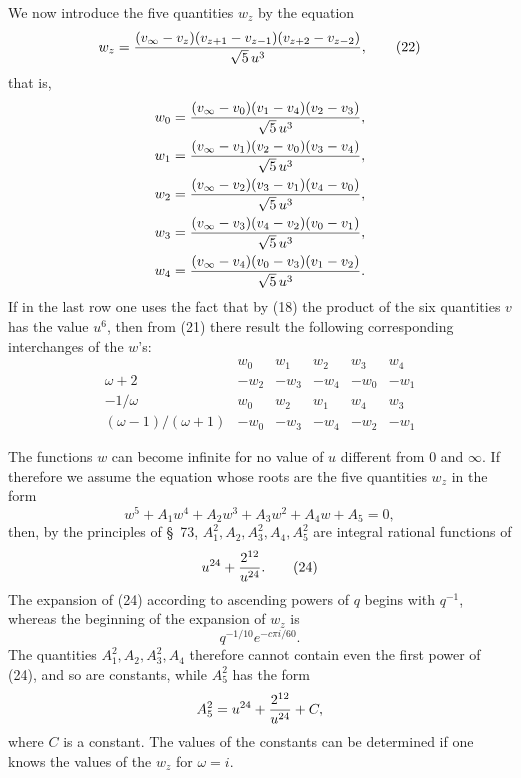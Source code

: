 \documentclass[11pt]{article}
\begin{document}
We now introduce the five quantities \(w_z\) by the equation
\begin{equation}
 w_z={(v_\infty-v_z)(v_{z+1}-v_{z-1})(v_{z+2}-v_{z-2})\over \sqrt5\,u^3},
\tag{22}
\end{equation}
that is,
\[
\begin{aligned}
w_0&={(v_\infty-v_0)(v_1-v_4)(v_2-v_3)\over\sqrt5\,u^3},\\
w_1&={(v_\infty-v_1)(v_2-v_0)(v_3-v_4)\over\sqrt5\,u^3},\\
w_2&={(v_\infty-v_2)(v_3-v_1)(v_4-v_0)\over\sqrt5\,u^3},\\
w_3&={(v_\infty-v_3)(v_4-v_2)(v_0-v_1)\over\sqrt5\,u^3},\\
w_4&={(v_\infty-v_4)(v_0-v_3)(v_1-v_2)\over\sqrt5\,u^3}.
\end{aligned}
\]
If in the last row one uses the fact that by (18) the product of the six quantities \(v\) has the value \(u^6\), then from (21) there result the following corresponding interchanges of the \(w\)'s:
\begin{equation}
\begin{array}{c|ccccc}
& w_0&w_1&w_2&w_3&w_4\\ \hline
\omega+2&-w_2&-w_3&-w_4&-w_0&-w_1\\
-1/\omega&w_0&w_2&w_1&w_4&w_3\\
(\omega-1)/(\omega+1)&-w_0&-w_3&-w_4&-w_2&-w_1
\end{array}
\tag{23}
\end{equation}

The functions \(w\) can become infinite for no value of \(u\) different from \(0\) and \(\infty\). If therefore we assume the equation whose roots are the five quantities \(w_z\) in the form
\[
 w^5+A_1w^4+A_2w^3+A_3w^2+A_4w+A_5=0,
\]
then, by the principles of \S~73, \(A_1^2,A_2,A_3^2,A_4,A_5^2\) are integral rational functions of
\begin{equation}
 u^{24}+{2^{12}\over u^{24}}.
\tag{24}
\end{equation}
The expansion of (24) according to ascending powers of \(q\) begins with \(q^{-1}\), whereas the beginning of the expansion of \(w_z\) is
\[
 q^{-1/10}e^{-c\pi i/60}.
\]
The quantities \(A_1^2,A_2,A_3^2,A_4\) therefore cannot contain even the first power of (24), and so are constants, while \(A_5^2\) has the form
\[
 A_5^2=u^{24}+{2^{12}\over u^{24}}+C,
\]
where \(C\) is a constant. The values of the constants can be determined if one knows the values of the \(w_z\) for \(\omega=i\).
\end{document}
